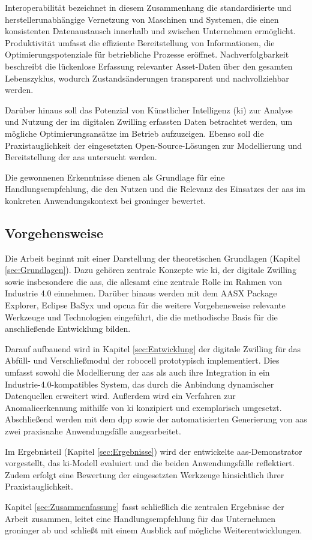 Interoperabilität bezeichnet in diesem Zusammenhang die standardisierte und hersteller\-unabhängige Vernetzung von Maschinen und Systemen, die einen konsistenten Datenaustausch innerhalb und zwischen Unternehmen ermöglicht. 
Produktivität umfasst die effiziente Bereitstellung von Informationen, die Optimierungspotenziale für betriebliche Prozesse eröffnet. 
Nachverfolgbarkeit beschreibt die lückenlose Erfassung relevanter Asset-Daten über den gesamten Lebenszyklus, wodurch Zustandsänderungen transparent und nachvollziehbar werden.

Darüber hinaus soll das Potenzial von Künstlicher Intelligenz (\acs{ki}) zur Analyse und Nutzung der im digitalen Zwilling erfassten Daten betrachtet werden, um mögliche Optimierungsansätze im Betrieb aufzuzeigen. 
Ebenso soll die Praxistauglichkeit der eingesetzten Open-Source-Lösungen zur Modellierung und Bereitstellung der \acs{aas} untersucht werden.

Die gewonnenen Erkenntnisse dienen als Grundlage für eine Handlungsempfehlung, die den Nutzen und die Relevanz des Einsatzes der \acs{aas} im konkreten Anwendungskontext bei groninger bewertet.

\subsection{Vorgehensweise}

Die Arbeit beginnt mit einer Darstellung der theoretischen Grundlagen (Kapitel \ref{sec:Grundlagen}). 
Dazu gehören zentrale Konzepte wie \acs{ki}, der digitale Zwilling sowie insbesondere die \acs{aas}, die allesamt eine zentrale Rolle im Rahmen von Industrie 4.0 einnehmen. 
Darüber hinaus werden mit dem AASX Package Explorer, Eclipse BaSyx und \ac{opcua} für die weitere Vorgehensweise relevante Werkzeuge und Technologien eingeführt, die die methodische Basis für die anschließende Entwicklung bilden.

Darauf aufbauend wird in Kapitel \ref{sec:Entwicklung} der digitale Zwilling für das Abfüll- und Verschließmodul der robocell prototypisch implementiert. 
Dies umfasst sowohl die Modellierung der \acs{aas} als auch ihre Integration in ein Industrie-4.0-kompatibles System, das durch die Anbindung dynamischer Datenquellen erweitert wird. 
Außerdem wird ein Verfahren zur Anomalieerkennung mithilfe von \acs{ki} konzipiert und exemplarisch umgesetzt. 
Abschließend werden mit dem \acs{dpp} sowie der automatisierten Generierung von \acs{aas} zwei praxisnahe Anwendungsfälle ausgearbeitet.

Im Ergebnisteil (Kapitel \ref{sec:Ergebnisse}) wird der entwickelte \acs{aas}-Demonstrator vorgestellt, das \acs{ki}-Modell evaluiert und die beiden Anwendungsfälle reflektiert. 
Zudem erfolgt eine Bewertung der eingesetzten Werkzeuge hinsichtlich ihrer Praxistauglichkeit.

Kapitel \ref{sec:Zusammenfassung} fasst schließlich die zentralen Ergebnisse der Arbeit zusammen, leitet eine Handlungs\-empfehlung für das Unternehmen groninger ab und schließt mit einem Ausblick auf mögliche Weiterentwicklungen.
